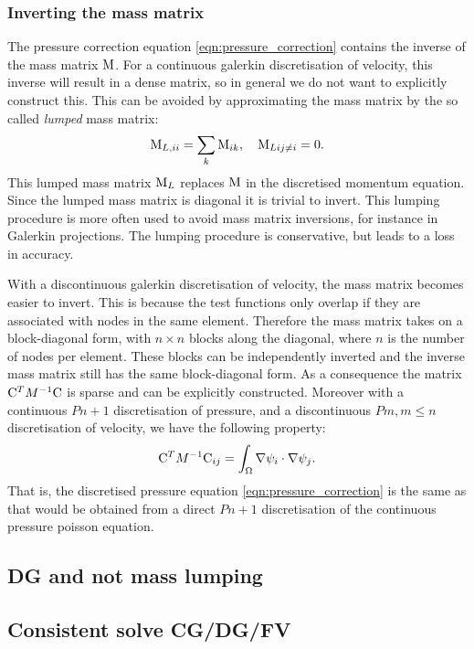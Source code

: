 \subsubsection{Inverting the mass matrix}
\label{Sect:ND_cg_mass_lumping}
The pressure correction equation \eqref{eqn:pressure_correction} contains
the inverse of the mass matrix $\mathrm{M}$. For a continuous galerkin
discretisation of velocity, this inverse will result in a dense 
matrix, so in general we do not want to explicitly construct 
this. This can be avoided by approximating the mass matrix by the 
so called \emph{lumped} mass matrix:
\begin{equation*}
  \mathrm{M}_{L,ii}=\sum_k \mathrm{M}_{ik},\quad \mathrm{M}_{Lij\neq i}=0.
\end{equation*}
This lumped mass matrix $\mathrm{M}_L$ replaces $\mathrm{M}$ in the 
discretised momentum equation. Since the lumped mass matrix is 
diagonal it is trivial to invert. This lumping procedure is more 
often used to avoid mass matrix inversions, for instance in 
Galerkin projections. The lumping procedure is conservative, 
but leads to a loss in accuracy.

With a discontinuous galerkin discretisation of velocity, the mass matrix
becomes easier to invert. This is because the test functions only overlap
if they are associated with nodes in the same element. Therefore the mass
matrix takes on a block-diagonal form, with $n\times n$ blocks along 
the diagonal, where $n$ is the number of nodes per element. These blocks
can be independently inverted and the inverse mass matrix still has the 
same block-diagonal form. As a consequence the matrix 
$\mathrm{C}^T M^{-1} \mathrm{C}$ is sparse and can be explicitly 
constructed. Moreover with a continuous $Pn+1$ discretisation of pressure,
and a discontinuous $Pm, m\leq n$ discretisation of velocity, we 
have the following property\citep{cotter2009}:
\begin{equation*}
  \mathrm{C}^T M^{-1} \mathrm{C}_{ij}=\int_\Omega \nabla \psi_i\cdot\nabla \psi_j.
\end{equation*}
That is, the discretised pressure equation \eqref{eqn:pressure_correction}
is the same as that would be obtained from a direct $Pn+1$ 
discretisation of the continuous pressure poisson equation.

\subsection{DG and not mass lumping}

\subsection{Consistent solve CG/DG/FV}

